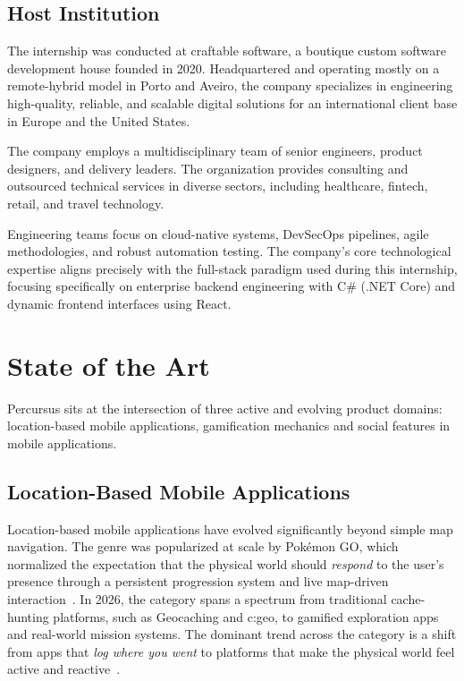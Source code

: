 \documentclass[11pt,a4paper]{article}
\begin{document}
\subsection{Host Institution}
\label{sub:company_profile}

The internship was conducted at craftable software, a boutique custom software development house founded in 2020.
Headquartered and operating mostly on a remote-hybrid model in Porto and Aveiro, the company specializes in engineering high-quality, reliable, and scalable digital solutions for an international client base in Europe and the United States.

The company employs a multidisciplinary team of senior engineers, product designers, and delivery leaders.
The organization provides consulting and outsourced technical services in diverse sectors, including healthcare, fintech, retail, and travel technology. ~\cite{craftable2026}

Engineering teams focus on cloud-native systems, DevSecOps pipelines, agile methodologies, and robust automation testing.
The company's core technological expertise aligns precisely with the full-stack paradigm used during this internship, focusing specifically on enterprise backend engineering with C\# (.NET Core) and dynamic frontend interfaces using React.

\vspace*{0.5cm}

\section{State of the Art}
\label{sec:sota}
 
Percursus sits at the intersection of three active and evolving product domains: location-based mobile applications, gamification mechanics and social features in mobile applications.


\subsection{Location-Based Mobile Applications}
\label{sub:sota:location}
 
Location-based mobile applications have evolved significantly beyond simple map navigation.
The genre was popularized at scale by Pokémon GO, which normalized the expectation that the physical world should \textit{respond} to the user's presence through a persistent progression system and live map-driven interaction~\cite{edgeorbital2026geocaching}.
In 2026, the category spans a spectrum from traditional cache-hunting platforms, such as Geocaching and c:geo, to gamified exploration apps and real-world mission systems.
The dominant trend across the category is a shift from apps that \textit{log where you went} to platforms that make the physical world feel active and reactive~\cite{edgeorbital2026geocaching}.
 
\end{document}
